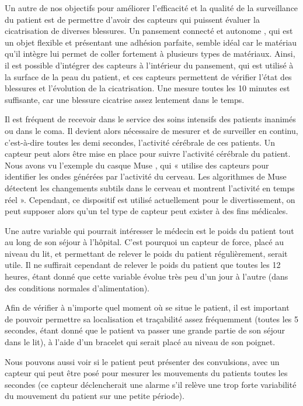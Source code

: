 \documentclass{article}
\begin{document}
Un autre de nos objectifs pour améliorer l’efficacité et la qualité de la surveillance du patient est de permettre d’avoir des capteurs qui puissent évaluer la cicatrisation de diverses blessures. Un pansement connecté et autonome \cite{Pansement}, qui est un objet flexible et présentant une adhésion parfaite, semble idéal car le matériau qu’il intègre lui permet de coller fortement à plusieurs types de matériaux. Ainsi, il est possible d’intégrer des capteurs à l’intérieur du pansement, qui est utilisé à la surface de la peau du patient, et ces capteurs permettent de vérifier l’état des blessures et l’évolution de la cicatrisation. Une mesure toutes les 10 minutes est suffisante, car une blessure cicatrise assez lentement dans le temps.

Il est fréquent de recevoir dans le service des soins intensifs des patients inanimés ou dans le coma. Il devient alors nécessaire de mesurer et de surveiller en continu, c’est-à-dire toutes les demi secondes, l’activité cérébrale de ces patients. Un capteur peut alors être mise en place pour suivre l’activité cérébrale du patient. Nous avons vu l’exemple du casque Muse \cite{Muse}, qui « utilise des capteurs pour identifier les ondes générées par l’activité du cerveau. Les algorithmes de Muse détectent les changements subtils dans le cerveau et montrent l’activité en temps réel ». Cependant, ce dispositif est utilisé actuellement pour le divertissement, on peut supposer alors qu’un tel type de capteur peut exister à des fins médicales.

Une autre variable qui pourrait intéresser le médecin est le poids du patient tout au long de son séjour à l’hôpital. C’est pourquoi un capteur de force, placé au niveau du lit, et permettant de relever le poids du patient régulièrement, serait utile. Il ne suffirait cependant de relever le poids du patient que toutes les 12 heures, étant donné que cette variable évolue très peu d’un jour à l'autre (dans des conditions normales d'alimentation).

Afin de vérifier à n’importe quel moment où se situe le patient, il est important de pouvoir permettre sa localisation et traçabilité \cite{Localisation} assez fréquemment (toutes les 5 secondes, étant donné que le patient va passer une grande partie de son séjour dans le lit), à l’aide d’un bracelet qui serait placé au niveau de son poignet. 

Nous pouvons aussi voir si le patient peut présenter des convulsions, avec un capteur \cite{Convulsion} qui peut être posé pour mesurer les mouvements du patients toutes les secondes (ce capteur déclencherait une alarme s’il relève une trop forte variabilité du mouvement du patient sur une petite période). 
\end{document}
